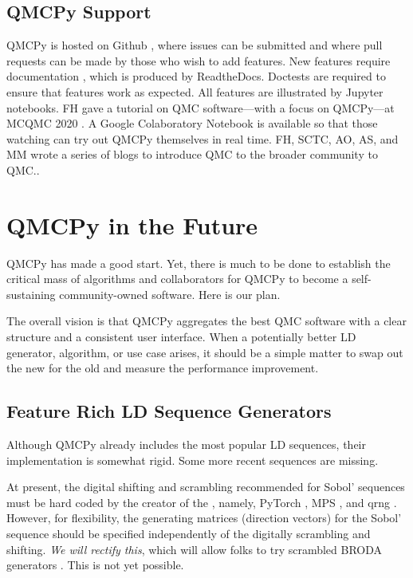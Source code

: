 \documentclass[11pt]{NSFamsart}
\begin{document}
\subsection{QMCPy Support}
QMCPy is hosted on Github \cite{QMCPy2020a}, where issues can be submitted and where pull requests can be made by those who wish to add features.  New features require documentation \cite{QMCPyDocs}, which is  produced by ReadtheDocs.  Doctests are required to ensure that features work as expected. All features are illustrated by Jupyter notebooks.  FH gave a tutorial on QMC software---with a focus on QMCPy---at MCQMC 2020 \cite{MCQMC2020QMCPyTut}.  A Google Colaboratory Notebook \cite{QMCPyTutColab2020}is available so that those watching  can try out QMCPy themselves in real time.  FH, SCTC, AO, AS, and MM wrote a series of blogs \cite{QMCBlog} to introduce QMC to the broader community to QMC..

\section{QMCPy in the Future}
QMCPy has made a good start.  Yet, there is much to be done to establish the critical mass of algorithms and collaborators for QMCPy to become a self-sustaining community-owned software.  Here is our plan.

The overall vision is that QMCPy aggregates the best QMC software with a clear structure and a consistent user interface.  When a potentially better LD generator, algorithm, or use case  arises, it should be a simple matter to swap out the new for the old and measure the performance improvement.

\subsection{Feature Rich LD Sequence Generators} \label{sec:richLD}
Although QMCPy already includes the most popular LD sequences, their implementation is somewhat rigid.  Some more recent sequences are missing.

At present, the digital shifting and scrambling recommended for Sobol' sequences must be hard coded by the creator of the , namely, PyTorch \cite{PyTorch}, MPS \cite{Nuy17a}, and qrng \cite{QRNG2020}.  However, for flexibility, the generating matrices (direction vectors) for the Sobol' sequence should be specified independently of the digitally scrambling and shifting.  \emph{We will rectify this}, which will allow folks to try scrambled BRODA generators \cite{BRODA20a}.  This is not yet possible.
\end{document}
